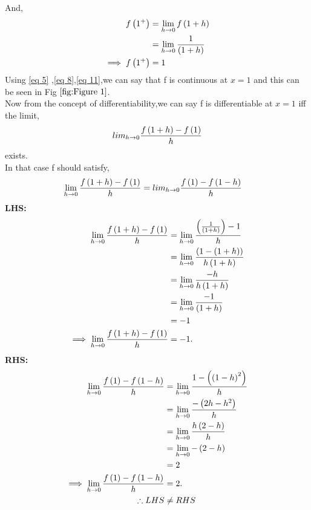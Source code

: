 \documentclass[journal,12pt,twocolumn]{IEEEtran}
\begin{document}
    And,
            \begin{align}
                 f\left(1^+\right) &= \lim_{h\to0}f\left(1+h\right)\\
                                    &= \lim_{h\to0} \frac{1}{\left(1+h\right)}\\
                 \implies f\left(1^+\right) &= 1\label{eq 11}
            \end{align}
    Using \eqref{eq 5} ,\eqref{eq 8},\eqref{eq 11},we can say that f is continuous at $ x = 1 $ and this can be seen in Fig $\ref{fig:Figure 1}$.\\
    Now from the concept of differentiability,we can say f is differentiable at $ x = 1 $ iff the limit,
             \[
                lim_{h \to 0}\frac{f\left(1 + h\right) - f\left(1\right)}{h}
             \] exists.\\
    In that case f should satisfy,
            \begin{align}
                 \lim_{h \to 0}\frac{f\brak{1 + h} - f\brak{1}}{h}  &=  lim_{h \to 0}\frac{f\brak{1} - f\brak{1-h}}{h}\label{eq 12} %
            \end{align}
 \textbf{LHS:}
            \begin{align}
                 \lim_{h \to 0}\frac{f\left(1 + h\right) - f\left(1\right)}{h} & = \lim_{h \to 0}\frac{\left(\frac{1}{\left(1+h\right)}\right) - 1}{h}\\
                 & = \lim_{h \to 0}\frac{{\left(1 - \left(1 + h\right)\right)}}{h\left(1 + h\right)}\\
                 & = \lim_{h \to 0}\frac{-h}{h\left(1 + h\right)}\\                                       
                 & = \lim_{h \to 0}\frac{-1}{\left(1 + h\right)}\\                         
                 & = -1\\
                 \implies \lim_{h \to 0}\frac{f\left(1 + h\right) - f\left(1\right)}{h} & = -1.
            \end{align}       
 \textbf{RHS:}
            \begin{align}
                 \lim_{h \to 0}\frac{f\left(1\right) - f\left(1-h\right)}{h}  &= \lim_{h \to 0}\frac{1 -\left(  \left(1 -h\right)^2\right)}{h}\\
                                                                                      &= \lim_{h \to 0}\frac{-\left(2h - h^2\right)}{h}\\
                    &= \lim_{h \to 0}\frac{h\left(2 - h\right)}{h}\\                                       
                &= \lim_{h \to 0}-\left(2 - h\right)\\    & = 2\\
                 \implies  \lim_{h \to 0}\frac{f\left(1\right) - f\left(1-h\right)}{h} &= 2.\\
                 \therefore LHS &\neq RHS \nonumber
            \end{align}
\end{document}
